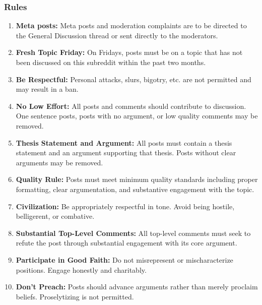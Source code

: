 \subsubsection{Rules}
\begin{enumerate}
    \item \textbf{Meta posts:} Meta posts and moderation complaints are to be directed to the General Discussion thread or sent directly to the moderators.
    
    \item \textbf{Fresh Topic Friday:} On Fridays, posts must be on a topic that has not been discussed on this subreddit within the past two months.
    
    \item \textbf{Be Respectful:} Personal attacks, slurs, bigotry, etc. are not permitted and may result in a ban.
    
    \item \textbf{No Low Effort:} All posts and comments should contribute to discussion. One sentence posts, posts with no argument, or low quality comments may be removed.
    
    \item \textbf{Thesis Statement and Argument:} All posts must contain a thesis statement and an argument supporting that thesis. Posts without clear arguments may be removed.
    
    \item \textbf{Quality Rule:} Posts must meet minimum quality standards including proper formatting, clear argumentation, and substantive engagement with the topic.
    
    \item \textbf{Civilization:} Be appropriately respectful in tone. Avoid being hostile, belligerent, or combative.
    
    \item \textbf{Substantial Top-Level Comments:} All top-level comments must seek to refute the post through substantial engagement with its core argument.
    
    \item \textbf{Participate in Good Faith:} Do not misrepresent or mischaracterize positions. Engage honestly and charitably.
    
    \item \textbf{Don't Preach:} Posts should advance arguments rather than merely proclaim beliefs. Proselytizing is not permitted.
\end{enumerate}

